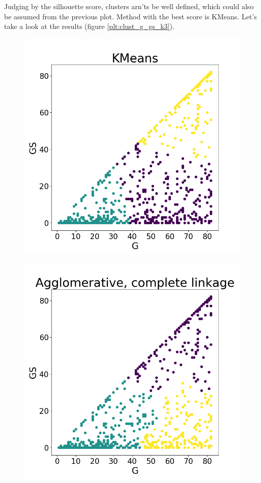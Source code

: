 \documentclass[a4paper]{article}
\begin{document}
Judging by the silhouette score, clusters arn'ts be well defined, which could also be assumed from the previous plot. Method with the best score is KMeans.
Let's take a look at the results (figure \ref{plt:clust_g_gs_k3}).

\begin{figure}
\centering
\begin{minipage}{.22\textwidth}
  \centering
  \includegraphics[scale=0.14]{kmeans_g_gs.png}
  \label{fig:kmeans_g_gs}
\end{minipage}
\begin{minipage}{.22\textwidth}
  \centering
  \includegraphics[scale=0.14]{complete_link_g_gs.png}

\end{minipage}
\end{figure}
\end{document}
